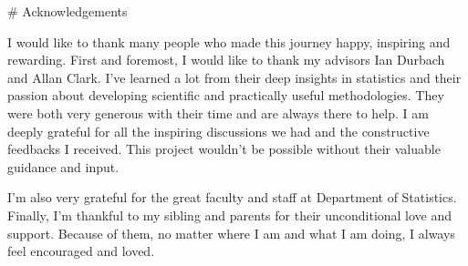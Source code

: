 # Acknowledgements 

I would like to thank many people who made this journey happy, inspiring and rewarding. First and foremost, I would like to thank my advisors Ian Durbach and Allan Clark. I’ve learned a lot from their deep insights in statistics and their passion about developing scientific and practically useful methodologies.  They were both very generous with their time and are always there to help. I am deeply grateful for all the inspiring discussions we had and the constructive feedbacks I received. This project wouldn’t be possible without their valuable guidance and input. 

I’m also very grateful for the great faculty and staff at Department of Statistics. Finally, I’m thankful to my sibling and parents for their unconditional love and support. Because of them, no matter where I am and what I am doing, I always feel encouraged and loved.